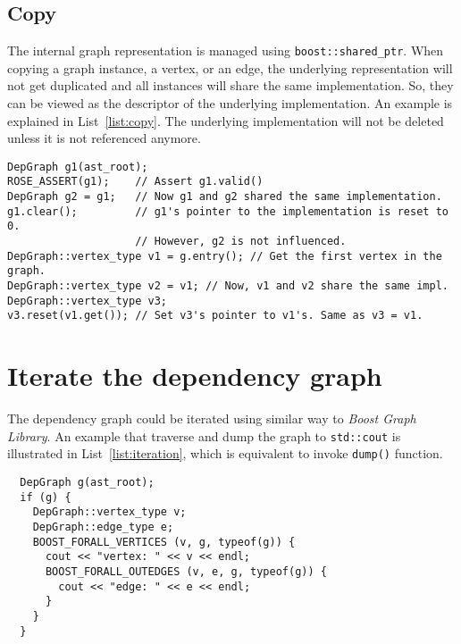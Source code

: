 \documentclass[preprint]{llncs}
\begin{document}
\subsection{Copy}
\label{sec:build:copy}
The internal graph representation is managed using \texttt{boost::shared\_ptr}.
When copying a graph instance, a vertex, or an edge,
  the underlying representation will not get duplicated
  and all instances will share the same implementation.
So, they can be viewed as the descriptor of the underlying implementation.
An example is explained in List~\ref{list:copy}.
The underlying implementation will not be deleted unless
  it is not referenced anymore.

\begin{lstlisting}
DepGraph g1(ast_root);
ROSE_ASSERT(g1);    // Assert g1.valid()
DepGraph g2 = g1;   // Now g1 and g2 shared the same implementation.
g1.clear();         // g1's pointer to the implementation is reset to 0.
                    // However, g2 is not influenced.
DepGraph::vertex_type v1 = g.entry(); // Get the first vertex in the graph.
DepGraph::vertex_type v2 = v1; // Now, v1 and v2 share the same impl.
DepGraph::vertex_type v3;
v3.reset(v1.get()); // Set v3's pointer to v1's. Same as v3 = v1.
\end{lstlisting}

%
\section{Iterate the dependency graph}
\label{sec:traverse}

The dependency graph could be iterated using similar way to \emph{Boost Graph Library}.
An example that traverse and dump the graph to \texttt{std::cout} is illustrated in List~\ref{list:iteration},
  which is equivalent to invoke \texttt{dump()} function.

\begin{lstlisting}
  DepGraph g(ast_root);
  if (g) {
    DepGraph::vertex_type v;
    DepGraph::edge_type e;
    BOOST_FORALL_VERTICES (v, g, typeof(g)) {
      cout << "vertex: " << v << endl;
      BOOST_FORALL_OUTEDGES (v, e, g, typeof(g)) {
        cout << "edge: " << e << endl;
      }
    }
  }
\end{lstlisting}
\end{document}
